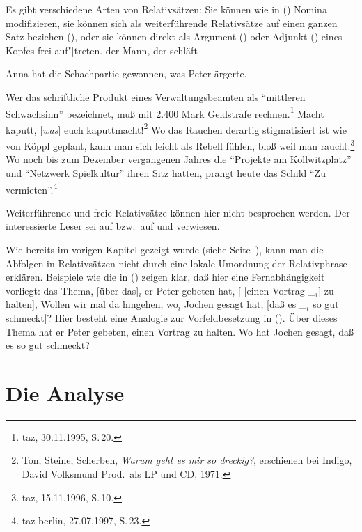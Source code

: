 {\noindent
Es gibt verschiedene Arten von Relativsätzen: Sie können wie in () Nomina modifizieren,
sie können sich als weiterführende Relativsätze auf einen ganzen Satz beziehen (), oder sie
können direkt als Argument () oder Adjunkt () eines Kopfes
frei auf"|treten.
\ea
der Mann, der schläft
\z

\ea
Anna hat die Schachpartie gewonnen, was Peter ärgerte.
\z                                              

\eal
\label{bsp-frei-rs-subj}
\ex Wer das schriftliche Produkt eines Verwaltungsbeamten 
      als "`mittleren Schwachsinn"' bezeichnet,
      muß mit 2.400 Mark Geldstrafe rechnen.\footnote{
        taz, 30.11.1995, S.\,20.}
\ex Macht kaputt, [\emph{was}] euch kaputtmacht!\footnote{
        Ton, Steine, Scherben, \emph{Warum geht es mir so dreckig?}, erschienen bei Indigo, David Volksmund Prod.\ als LP und CD, 1971.
      }
\zl
\eal
\label{bsp-frei-rs-mod}
\ex Wo das Rauchen derartig stigmatisiert ist wie von Köppl geplant, 
      kann man sich leicht als Rebell fühlen, bloß weil man raucht.\footnote{
	taz, 15.11.1996, S.\,10.
}\label{bsp-rauchen-stigmatisiert}
\ex Wo noch bis zum Dezember vergangenen Jahres die "`Projekte am Kollwitzplatz"' und
      "`Netzwerk Spielkultur"' ihren Sitz hatten, prangt heute das Schild "`Zu vermieten"'.\footnote{
        taz berlin, 27.07.1997, S.\,23.
        }
\zl
}%

\noindent
Weiterführende und freie Relativsätze können hier nicht besprochen werden. Der interessierte Leser
sei auf  bzw.\ auf  und  verwiesen.

Wie bereits im vorigen Kapitel gezeigt wurde (siehe Seite~\pageref{bsp-nla-rs}), 
kann man die Abfolgen in Relativsätzen nicht durch
eine lokale Umordnung der Relativphrase erklären. Beispiele wie die in () zeigen
klar, daß hier eine Fernabhängigkeit vorliegt:
\ea
das Thema, [über das]$_i$ er Peter gebeten hat, [ [einen Vortrag \_$_i$] zu halten],
\z
\ea
Wollen wir mal da hingehen, wo$_i$ Jochen gesagt hat, [daß es \_$_i$ so gut schmeckt]?
\z
Hier besteht eine Analogie zur Vorfeldbesetzung in ().
\eal
\ex Über dieses Thema hat er Peter gebeten, einen Vortrag zu halten.
\ex Wo hat Jochen gesagt, daß es so gut schmeckt?
\zl



\section{Die Analyse}
\label{sec-rs-anal}

